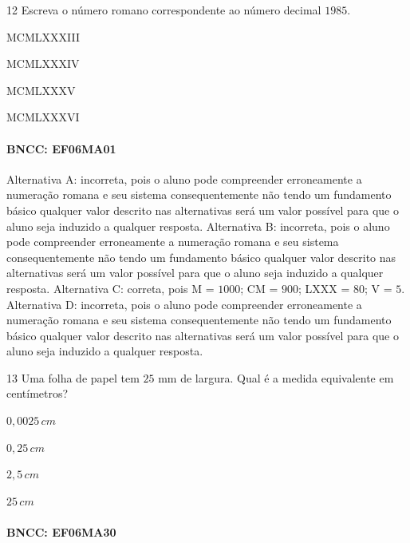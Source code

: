 {\num{12} Escreva o número romano correspondente ao número decimal $1985$.

\begin{escolha}
\item MCMLXXXIII
\item MCMLXXXIV
\item MCMLXXXV
\item MCMLXXXVI
\end{escolha}

\paragraph{BNCC: EF06MA01 }

Alternativa A: incorreta, pois o aluno pode compreender erroneamente a
numeração romana e seu sistema consequentemente não tendo um fundamento
básico qualquer valor descrito nas alternativas será um valor possível
para que o aluno seja induzido a qualquer resposta.
Alternativa B: incorreta, pois o aluno pode compreender erroneamente a
numeração romana e seu sistema consequentemente não tendo um fundamento
básico qualquer valor descrito nas alternativas será um valor possível
para que o aluno seja induzido a qualquer resposta.
Alternativa C: correta, pois M = $1000$; CM = $900$; LXXX = $80$; V = $5$.
Alternativa D: incorreta, pois o aluno pode compreender erroneamente a
numeração romana e seu sistema consequentemente não tendo um fundamento
básico qualquer valor descrito nas alternativas será um valor possível
para que o aluno seja induzido a qualquer resposta.

\num{13} Uma folha de papel tem $25$ mm de largura. Qual é a medida equivalente
em centímetros?

\begin{escolha}
\item $0,0025\,cm$
\item $0,25\,cm$
\item $2,5\,cm$
\item $25\,cm$
\end{escolha}

\paragraph{BNCC: EF06MA30 }

}
